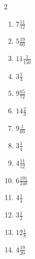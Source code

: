 \documentclass[12pt]{article}
\begin{document}
\begin{multicols}{2}
\begin{enumerate}
\item $ 7 \frac{11}{12} $
\item $ 5 \frac{19}{60} $
\item $ 11 \frac{1}{150} $
\item $ 3 \frac{1}{4} $
\item $ 9 \frac{65}{72} $
\item $ 14 \frac{2}{3} $
\item $ 9 \frac{1}{60} $
\item $ 3 \frac{1}{4} $
\item $ 4 \frac{11}{12} $
\item $ 6 \frac{191}{240} $
\item $ 4 \frac{1}{4} $
\item $ 3 \frac{1}{2} $
\item $ 12 \frac{1}{8} $
\item $ 4 \frac{19}{20} $
\end{enumerate}\end{multicols}\newpage
\end{document}
